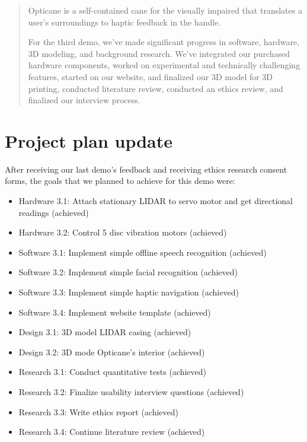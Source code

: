 \documentclass{article}
\begin{document}
 



\begin{abstract} 
Opticane is a self-contained cane for the visually impaired that translates a user's surroundings to haptic feedback in the handle.

For the third demo, we've made significant progress in software, hardware, 3D modeling, and background research. We've integrated our purchased hardware components, worked on experimental and technically challenging features, started on our website, and finalized our 3D model for 3D printing, conducted literature review, conducted an ethics review, and finalized our interview process.
\end{abstract} 

\section{Project plan update} 

After receiving our last demo's feedback and receiving ethics research consent forms, the goals that we planned to achieve for this demo were:
\begin{itemize}
    \item Hardware 3.1: Attach stationary LIDAR to servo motor and get directional readings (achieved)
    \item Hardware 3.2: Control 5 disc vibration motors (achieved)
    \item Software 3.1: Implement simple offline speech recognition (achieved)
    \item Software 3.2: Implement simple facial recognition (achieved)
    \item Software 3.3: Implement simple haptic navigation (achieved)
    \item Software 3.4: Implement website template (achieved)
    \item Design 3.1: 3D model LIDAR casing (achieved)
    \item Design 3.2: 3D mode Opticane's interior (achieved)
    \item Research 3.1: Conduct quantitative tests (achieved)
    \item Research 3.2: Finalize usability interview questions (achieved)
    \item Research 3.3: Write ethics report (achieved)
    \item Research 3.4: Continue literature review (achieved)
\end{itemize}
\end{document}
